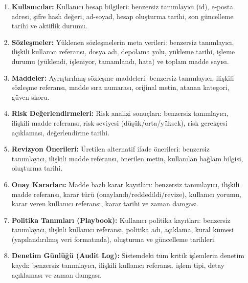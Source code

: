 \documentclass[12pt, a4paper]{article}
\begin{document}
\begin{enumerate}[leftmargin=2cm]
    \item \textbf{Kullanıcılar:} Kullanıcı hesap bilgileri: benzersiz tanımlayıcı (id), e-posta adresi, şifre hash değeri, ad-soyad, hesap oluşturma tarihi, son güncelleme tarihi ve aktiflik durumu.

    \item \textbf{Sözleşmeler:} Yüklenen sözleşmelerin meta verileri: benzersiz tanımlayıcı, ilişkili kullanıcı referansı, dosya adı, depolama yolu, yükleme tarihi, işleme durumu (yüklendi, işleniyor, tamamlandı, hata) ve toplam madde sayısı.

    \item \textbf{Maddeler:} Ayrıştırılmış sözleşme maddeleri: benzersiz tanımlayıcı, ilişkili sözleşme referansı, madde sıra numarası, orijinal metin, atanan kategori, güven skoru.

    \item \textbf{Risk Değerlendirmeleri:} Risk analizi sonuçları: benzersiz tanımlayıcı, ilişkili madde referansı, risk seviyesi (düşük/orta/yüksek), risk gerekçesi açıklaması, değerlendirme tarihi.

    \item \textbf{Revizyon Önerileri:} Üretilen alternatif ifade önerileri: benzersiz tanımlayıcı, ilişkili madde referansı, önerilen metin, kullanılan bağlam bilgisi, oluşturma tarihi.

    \item \textbf{Onay Kararları:} Madde bazlı karar kayıtları: benzersiz tanımlayıcı, ilişkili madde referansı, karar türü (onaylandı/reddedildi/revize), kullanıcı yorumu, karar veren kullanıcı referansı, karar tarihi ve zaman damgası.

    \item \textbf{Politika Tanımları (Playbook):} Kullanıcı politika kayıtları: benzersiz tanımlayıcı, ilişkili kullanıcı referansı, politika adı, açıklama, kural kümesi (yapılandırılmış veri formatında), oluşturma ve güncelleme tarihleri.

    \item \textbf{Denetim Günlüğü (Audit Log):} Sistemdeki tüm kritik işlemlerin denetim kaydı: benzersiz tanımlayıcı, ilişkili kullanıcı referansı, işlem tipi, detay açıklaması ve zaman damgası.
\end{enumerate}
\end{document}
